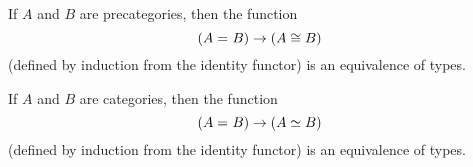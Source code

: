 \documentclass[hott-all.tex]{subfiles}
\begin{document}
\begin{lem}
  If $A$ and $B$ are precategories, then the function
  \[(A =_{} B) \to (A\cong B)\]
  (defined by induction from the identity functor) is an equivalence of types.
\end{lem}
%

\begin{thm}
  If $A$ and $B$ are categories, then the function
  \[(A =_{} B) \to (A \simeq B)\]
  (defined by induction from the identity functor) is an equivalence of types.
\end{thm}
%
%
\end{document}
